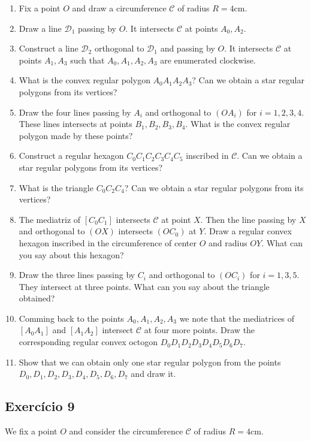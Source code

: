 \begin{enumerate}
\item Fix a point $O$ and draw a circumference
  $\mathcal C$ of radius $R=4\text{cm}$.
\item Draw a line ${\mathcal D}_1$ passing by $O$. It intersects $\mathcal C$
  at points $A_0, A_2$.
\item Construct a line ${\mathcal D}_2$ orthogonal to ${\mathcal D}_1$ and
  passing by $O$. It intersects $\mathcal C$ at points $A_1, A_3$
  such that $A_0,A_1,A_2,A_3$ are enumerated clockwise.
\item What is the convex regular polygon $A_0A_1A_2A_3$?
  Can we obtain a star regular polygons from its vertices?
\item Draw the four lines passing by $A_i$ and orthogonal to $(OA_i)$ for
  $i = 1, 2, 3, 4$. These lines intersects at points
  $B_1, B_2, B_3, B_4$. What is the convex regular polygon made by these points?
\item Construct a regular hexagon $C_0C_1C_2C_3C_4C_5$ inscribed in $\mathcal C$.
  Can we obtain a star regular polygons from its vertices?
\item What is the triangle $C_0C_2C_4$?
  Can we obtain a star regular polygons from its vertices?
\item The mediatriz of $[C_0C_1]$ intersects $\mathcal C$ at point $X$.
  Then the line passing by $X$ and orthogonal to $(OX)$ intersects
  $(OC_0)$ at $Y$. Draw a regular convex hexagon inscribed in the circumference
  of center $O$ and radius $OY$. What can you say about this hexagon?
\item Draw the three lines passing by $C_i$ and orthogonal to $(OC_i)$ for
  $i = 1, 3, 5$. They intersect at three points. What can you say about the
  triangle obtained?
\item Comming back to the points $A_0,A_1,A_2,A_3$ we note that the mediatrices
  of $[A_0A_1]$ and $[A_1A_2]$ intersect $\mathcal C$ at four more points.
  Draw the corresponding regular convex octogon $D_0D_1D_2D_3D_4D_5D_6D_7$.
\item Show that we can obtain only one star regular polygon from the
  points $D_0, D_1, D_2, D_3, D_4, D_5, D_6, D_7$ and draw it.
\end{enumerate}

\subsection{Exercício 9}

We fix a point $O$ and consider the circumference $\mathcal C$ of radius
$R=4\text{cm}$.

